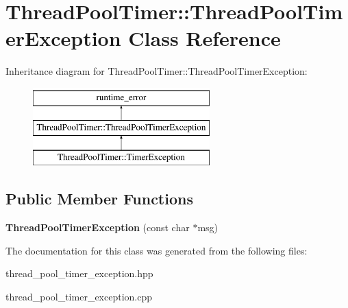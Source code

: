 \hypertarget{classThreadPoolTimer_1_1ThreadPoolTimerException}{\section{Thread\-Pool\-Timer\-:\-:Thread\-Pool\-Timer\-Exception Class Reference}
\label{classThreadPoolTimer_1_1ThreadPoolTimerException}
}
Inheritance diagram for Thread\-Pool\-Timer\-:\-:Thread\-Pool\-Timer\-Exception\-:\begin{figure}[H]
\begin{center}
\leavevmode
\includegraphics[height=3.000000cm]{classThreadPoolTimer_1_1ThreadPoolTimerException}
\end{center}
\end{figure}
\subsection*{Public Member Functions}
\begin{DoxyCompactItemize}
\item 
\hypertarget{classThreadPoolTimer_1_1ThreadPoolTimerException_ae8c93063905438c07aab0d52997a1959}{{\bfseries Thread\-Pool\-Timer\-Exception} (const char $\ast$msg)}\label{classThreadPoolTimer_1_1ThreadPoolTimerException_ae8c93063905438c07aab0d52997a1959}

\end{DoxyCompactItemize}


The documentation for this class was generated from the following files\-:\begin{DoxyCompactItemize}
\item 
thread\-\_\-pool\-\_\-timer\-\_\-exception.\-hpp\item 
thread\-\_\-pool\-\_\-timer\-\_\-exception.\-cpp\end{DoxyCompactItemize}
